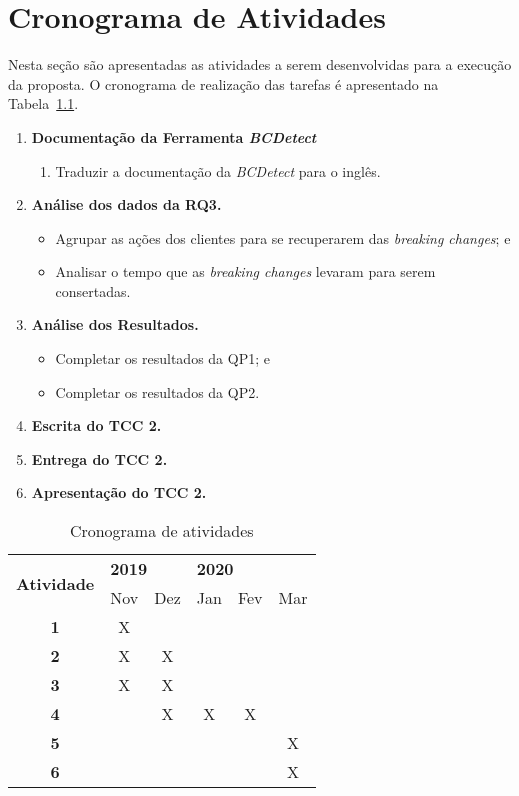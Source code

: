 \chapter{Cronograma de Atividades}
\label{cap:cronograma}

Nesta seção são apresentadas as atividades a serem desenvolvidas para a execução da proposta. O cronograma de realização das tarefas é apresentado na Tabela~\ref{tab:cronograma}.

\begin{enumerate}
\item \textbf{Documentação da Ferramenta \textit{BCDetect}}
    \begin{enumerate}
        \item Traduzir a documentação da \textit{BCDetect} para o inglês.
    \end{enumerate}{}
\item \textbf{Análise dos dados da RQ3.}
    \begin{itemize}
        \item Agrupar as ações dos clientes para se recuperarem das \textit{breaking changes}; e
        \item Analisar o tempo que as \textit{breaking changes} levaram para serem consertadas.
    \end{itemize}{}
\item \textbf{Análise dos Resultados.}
    \begin{itemize}
        \item Completar os resultados da QP1; e
        \item Completar os resultados da QP2.
    \end{itemize}{}
\item \textbf{Escrita do TCC 2.}
\item \textbf{Entrega do TCC 2.}
\item \textbf{Apresentação do TCC 2.}
\end{enumerate}

\begin{table}[h!]
\centering
\renewcommand{\arraystretch}{1.3}
\caption{Cronograma de atividades}
\label{tab:cronograma}
\begin{tabular}{|c|c|c|c|c|c|}
\hline
\multirow{2}{*}{\textbf{Atividade}} & \multicolumn{2}{l|}{\textbf{2019}} & \multicolumn{3}{l|}{\textbf{2020}} \\ \cline{2-6} 
             & Nov & Dez & Jan & Fev & Mar \\ \hline
\textbf{1}   &  X  &     &     &     &     \\ \hline
\textbf{2}   &  X  &  X  &     &     &     \\ \hline
\textbf{3}   &  X  &  X  &     &     &     \\ \hline
\textbf{4}   &     &  X  &  X  &  X  &     \\ \hline
\textbf{5}   &     &     &     &     &  X  \\ \hline
\textbf{6}   &     &     &     &     &  X  \\ \hline
\end{tabular}
\end{table}